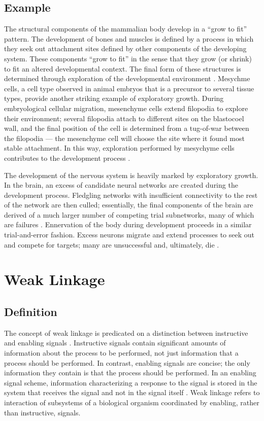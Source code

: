\subsection{Example}
The structural components of the mammalian body develop in a ``grow to fit'' pattern. The development of bones and muscles is defined by a process in which they seek out attachment sites defined by other components of the developing system. These components ``grow to fit'' in the sense that they grow (or shrink) to fit an altered developmental context. The final form of these structures is determined through exploration of the developmental environment \cite[pg 214]{Downing2015IntelligenceSystems}. Mesychme cells, a cell type observed in animal embryos that is a precursor to several tissue types, provide another striking example of exploratory growth. During embryological cellular migration, mesenchyme cells extend filopodia to explore their environment; several filopodia attach to different sites on the blastocoel wall, and the final position of the cell is determined from a tug-of-war between the filopodia --- the mesenchyme cell will choose the site where it found most stable attachment. In this way, exploration performed by mesychyme cells contributes to the development process \cite[pg 214]{Downing2015IntelligenceSystems}.

The development of the nervous system is heavily marked by exploratory growth. In the brain, an excess of candidate neural networks are created during the development process. Fledgling networks with insufficient connectivity to the rest of the network are then culled; essentially, the final components of the brain are derived of a much larger number of competing trial subnetworks, many of which are failures \cite[p 214]{Downing2015IntelligenceSystems}. Ennervation of the body during development proceeds in a similar trial-and-error fashion. Excess neurons migrate and extend processes to seek out and compete for targets; many are unsuccessful and, ultimately, die \cite{Edelman2001DegeneracySystems}.

\section{Weak Linkage}

\subsection{Definition}
The concept of weak linkage is predicated on a distinction between instructive and enabling signals \cite[p 210]{Downing2015IntelligenceSystems}.
Instructive signals contain significant amounts of information about the process to be performed, not just information that a process should be performed. 
In contrast, enabling signals are concise; the only information they contain is that the process should be performed.
In an enabling signal scheme, information characterizing a response to the signal is stored in the system that receives the signal and not in the signal itself \cite[p 283]{Kirschner2005TheDilemma}.
Weak linkage refers to interaction of subsystems of a biological organism coordinated by enabling, rather than instructive, signals.

